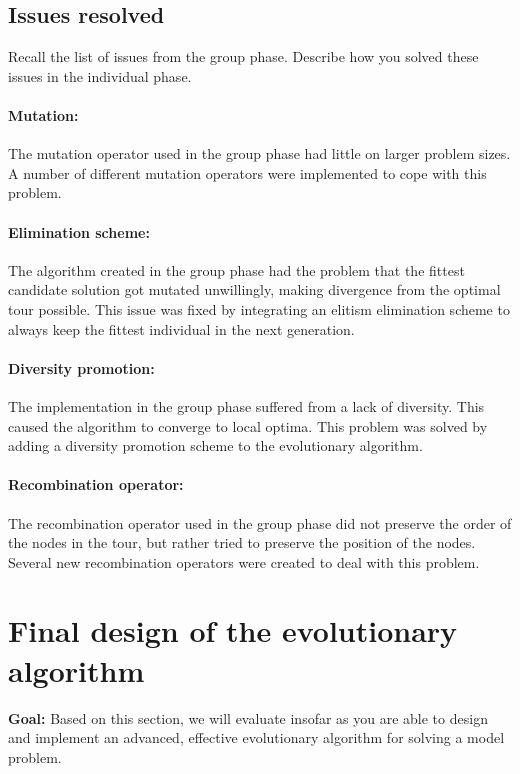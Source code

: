 \documentclass[a4paper,10pt]{article}
\newcommand{\ReplaceMe}[1]{{\color{blue}#1}}
\newcommand{\RemoveMe}[1]{{\color{purple}#1}}
\begin{document}
\subsection{Issues resolved}
\ReplaceMe{Recall the list of issues from the group phase. Describe how you solved these issues in the individual phase.}

\paragraph{Mutation:} The mutation operator used in the group phase had little on larger problem sizes. A number of different mutation operators were implemented to cope with this problem.

\paragraph{Elimination scheme:} The algorithm created in the group phase had the problem that the fittest candidate solution got mutated unwillingly, making divergence from the optimal tour possible. This issue was fixed by integrating an elitism elimination scheme to always keep the fittest individual in the next generation.

\paragraph{Diversity promotion:} The implementation in the group phase suffered from a lack of diversity. This caused the algorithm to converge to local optima. This problem was solved by adding a diversity promotion scheme to the evolutionary algorithm.

\paragraph{Recombination operator:} The recombination operator used in the group phase did not preserve the order of the nodes in the tour, but rather tried to preserve the position of the nodes. Several new recombination operators were created to deal with this problem.

\section{Final design of the evolutionary algorithm}  \label{sec:evolutionary algorithm}

\RemoveMe{\textbf{Goal:} Based on this section, we will evaluate insofar as you are able to design and implement an advanced, effective evolutionary algorithm for solving a model problem.}
\end{document}
